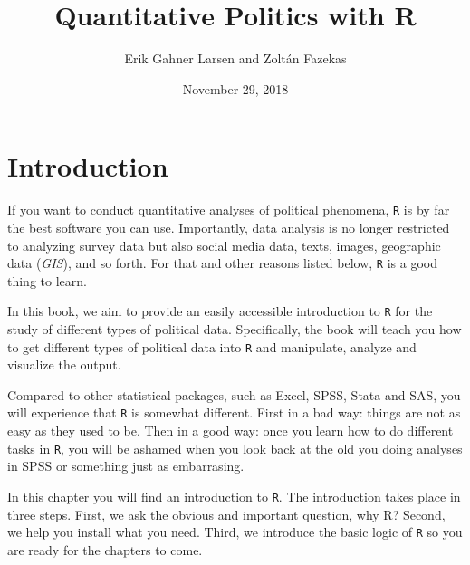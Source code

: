 \documentclass[12pt,oneside]{reedthesis}
\title{\Huge{ Quantitative Politics with R } \vspace{2em}}
\author{Erik Gahner Larsen and Zoltán Fazekas}
\date{November 29, 2018}
\theoremstyle{definition}
\theoremstyle{definition}
\theoremstyle{definition}
\theoremstyle{remark}
\begin{document}
      \maketitle
  
  \frontmatter %
  \pagestyle{empty} %

  
  
      \hypersetup{linkcolor=black}
    \setcounter{tocdepth}{2}
    \tableofcontents
  
  
  
  
  
  \mainmatter %
  \pagestyle{fancyplain} %

  \chapter{Introduction}\label{introduction}
  
  If you want to conduct quantitative analyses of political phenomena,
  \texttt{R} is by far the best software you can use. Importantly, data
  analysis is no longer restricted to analyzing survey data but also
  social media data, texts, images, geographic data (\emph{GIS}), and so
  forth. For that and other reasons listed below, \texttt{R} is a good
  thing to learn.
  
  In this book, we aim to provide an easily accessible introduction to
  \texttt{R} for the study of different types of political data.
  Specifically, the book will teach you how to get different types of
  political data into \texttt{R} and manipulate, analyze and visualize the
  output.
  
  Compared to other statistical packages, such as Excel, SPSS, Stata and
  SAS, you will experience that \texttt{R} is somewhat different. First in
  a bad way: things are not as easy as they used to be. Then in a good
  way: once you learn how to do different tasks in \texttt{R}, you will be
  ashamed when you look back at the old you doing analyses in SPSS or
  something just as embarrasing.
  
  In this chapter you will find an introduction to \texttt{R}. The
  introduction takes place in three steps. First, we ask the obvious and
  important question, why R? Second, we help you install what you need.
  Third, we introduce the basic logic of \texttt{R} so you are ready for
  the chapters to come.
  
\end{document}

